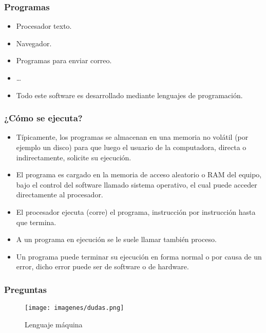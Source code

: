 \documentclass{beamer}
\begin{document}
\begin{frame}
\frametitle{Programas}
\begin{itemize}[<+->]
\item Procesador texto.
\item Navegador.
\item Programas para enviar correo. 
\item \dots
\item Todo este software es desarrollado mediante lenguajes de programación.
\end{itemize}
\end{frame}


\begin{frame}
\frametitle{¿Cómo se ejecuta?}
\begin{itemize}[<+->]
\item Típicamente, los programas se almacenan en una memoria no volátil (por ejemplo un disco) para que luego el usuario de la computadora, directa o indirectamente, solicite su ejecución.
\item El programa es cargado en la memoria de acceso aleatorio o RAM del equipo, bajo el control del software llamado sistema operativo, el cual puede acceder directamente al procesador. 
\item El procesador ejecuta (corre) el programa, instrucción por instrucción hasta que termina.
\item A un programa en ejecución se le suele llamar también proceso. 
\item Un programa puede terminar su ejecución en forma normal o por causa de un error, dicho error puede ser de software o de hardware.
\end{itemize}
\end{frame}


\begin{frame}
\frametitle{Preguntas} 
\begin{figure}
\texttt{[image: imagenes/dudas.png]} 
\caption{Lenguaje máquina}
\end{figure} 
\end{frame}
\end{document}
